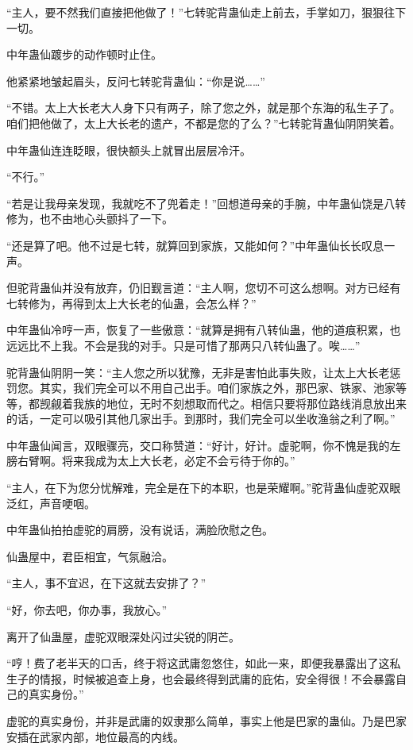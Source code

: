 \begin{this_body}
“主人，要不然我们直接把他做了！”七转驼背蛊仙走上前去，手掌如刀，狠狠往下一切。

中年蛊仙踱步的动作顿时止住。

他紧紧地皱起眉头，反问七转驼背蛊仙：“你是说……”

“不错。太上大长老大人身下只有两子，除了您之外，就是那个东海的私生子了。咱们把他做了，太上大长老的遗产，不都是您的了么？”七转驼背蛊仙阴阴笑着。

中年蛊仙连连眨眼，很快额头上就冒出层层冷汗。

“不行。”

“若是让我母亲发现，我就吃不了兜着走！”回想道母亲的手腕，中年蛊仙饶是八转修为，也不由地心头颤抖了一下。

“还是算了吧。他不过是七转，就算回到家族，又能如何？”中年蛊仙长长叹息一声。

但驼背蛊仙并没有放弃，仍旧觐言道：“主人啊，您切不可这么想啊。对方已经有七转修为，再得到太上大长老的仙蛊，会怎么样？”

中年蛊仙冷哼一声，恢复了一些傲意：“就算是拥有八转仙蛊，他的道痕积累，也远远比不上我。不会是我的对手。只是可惜了那两只八转仙蛊了。唉……”

驼背蛊仙阴阴一笑：“主人您之所以犹豫，无非是害怕此事失败，让太上大长老惩罚您。其实，我们完全可以不用自己出手。咱们家族之外，那巴家、铁家、池家等等，都觊觎着我族的地位，无时不刻想取而代之。相信只要将那位路线消息放出来的话，一定可以吸引其他几家出手。到那时，我们完全可以坐收渔翁之利了啊。”

中年蛊仙闻言，双眼骤亮，交口称赞道：“好计，好计。虚驼啊，你不愧是我的左膀右臂啊。将来我成为太上大长老，必定不会亏待于你的。”

“主人，在下为您分忧解难，完全是在下的本职，也是荣耀啊。”驼背蛊仙虚驼双眼泛红，声音哽咽。

中年蛊仙拍拍虚驼的肩膀，没有说话，满脸欣慰之色。

仙蛊屋中，君臣相宜，气氛融洽。

“主人，事不宜迟，在下这就去安排了？”

“好，你去吧，你办事，我放心。”

离开了仙蛊屋，虚驼双眼深处闪过尖锐的阴芒。

“哼！费了老半天的口舌，终于将这武庸忽悠住，如此一来，即便我暴露出了这私生子的情报，时候被追查上身，也会最终得到武庸的庇佑，安全得很！不会暴露自己的真实身份。”

虚驼的真实身份，并非是武庸的奴隶那么简单，事实上他是巴家的蛊仙。乃是巴家安插在武家内部，地位最高的内线。


\end{this_body}
